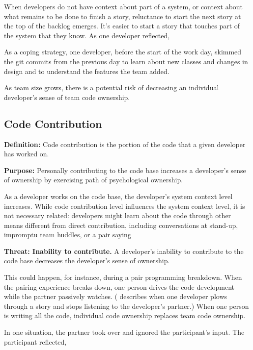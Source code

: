 When developers do not have context about part of a system, or context about what remains to be done to finish a story, reluctance to start the next story at the top of the backlog emerges. It's easier to start a story that touches part of the system that they know. As one developer reflected, 


As a coping strategy, one developer, before the start of the work day, skimmed the git commits from the previous day to learn about new classes and changes in design and to understand the features the team added. 


As team size grows, there is a potential risk of decreasing an individual developer's sense of team code ownership. 


\subsection{Code Contribution}
\textbf{Definition:} Code contribution is the portion of the code that a given developer has worked on. 


\textbf{Purpose:} Personally contributing to the code base increases a developer's sense of ownership by exercising  path of psychological ownership. 


As a developer works on the code base, the developer's system context level increases. While code contribution level influences the system context level, it is not necessary related: developers might learn about the code through other means different from direct contribution, including conversations at stand-up, impromptu team huddles, or a pair saying 


\textbf{Threat: Inability to contribute.}  A developer's inability to contribute to the code base decreases the developer's sense of ownership. 


This could happen, for instance, during a pair programming breakdown. When the pairing experience breaks down, one person drives the code development while the partner passively watches. ( describes when one developer plows through a story and stops listening to the developer's partner.)  When one person is writing all the code, individual code ownership replaces team code ownership.  


In one situation, the partner took over and ignored the participant's input. The participant reflected,  


